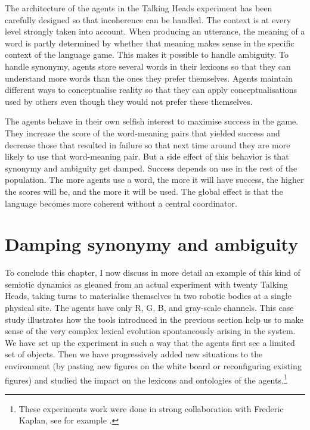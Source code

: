 The architecture of the agents in the Talking Heads
experiment has been carefully designed so that incoherence
can be handled. The context
is at every level strongly taken into account. When 
producing an utterance, the meaning of a word is partly
determined by whether
that meaning makes sense in the specific context
of the language game. This makes it possible to 
handle ambiguity. To handle synonymy, agents store several words in 
their lexicons so that they can understand more words
than the ones they prefer themselves. Agents maintain 
different ways to conceptualise reality so that 
they can apply conceptualisations used by others
even though they would not prefer these themselves. 

The agents behave in their own selfish interest to 
maximise success in the game. They increase the score 
of the word-meaning pairs that yielded success and decrease
those that resulted in failure so that next time around 
they are more likely to use that word-meaning pair. 
But a side effect of this behavior is 
that synonymy and ambiguity get damped. Success depends 
on use in the rest of the population. The more 
agents use a word, the more it will have success, 
the higher the scores will be, and the more it will be used. 
The global effect is that the language becomes more
coherent without a central coordinator. 

\section{Damping synonymy and ambiguity}

To conclude this chapter, I now discuss in more 
detail an example of this kind of semiotic dynamics as
gleaned from  an actual experiment with twenty Talking
Heads, taking turns to materialise themselves in two robotic 
bodies at a single physical site. The agents have 
only R, G, B, and gray-scale channels. This 
case study illustrates how the tools introduced in 
the previous section help us to make sense of
the very complex lexical evolution spontaneously 
arising in the system. We have set up the experiment
in such a way that the agents first see a limited set 
of objects. Then we
have progressively added new situations
to the environment (by pasting new figures on 
the white board or reconfiguring existing figures) and studied
the impact on the lexicons and ontologies of the agents.\footnote{
These experiments work were done in strong collaboration with 
Frederic Kaplan, see for example \cite{Steels:1999}.}


